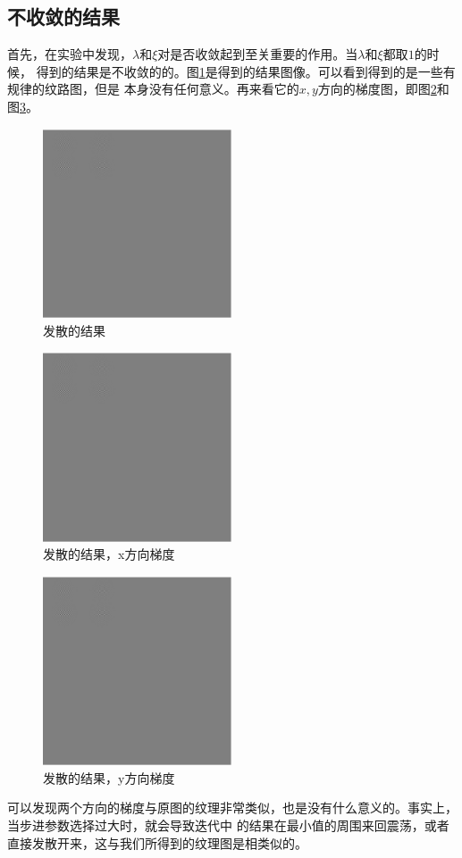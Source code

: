 \subsection{不收敛的结果}
首先，在实验中发现，$\lambda$和$\xi$对是否收敛起到至关重要的作用。当$\lambda$和$\xi$都取$1$的时候，
得到的结果是不收敛的的。图\ref{fig:Iout1}是得到的结果图像。可以看到得到的是一些有规律的纹路图，但是
本身没有任何意义。再来看它的$x,y$方向的梯度图，即图\ref{fig:Ioutx1}和图\ref{fig:Iouty1}。
\begin{figure}[h!]
\center
\includegraphics[width=0.5\textwidth]{figure/gradtest/Iout1}
\caption{发散的结果}\label{fig:Iout1}
\end{figure}
\begin{figure}[h!]
\center
\includegraphics[width=0.5\textwidth]{figure/gradtest/Ioutx1}
\caption{发散的结果，x方向梯度}\label{fig:Ioutx1}
\end{figure}
\begin{figure}[h!]
\center
\includegraphics[width=0.5\textwidth]{figure/gradtest/Iouty1}
\caption{发散的结果，y方向梯度}\label{fig:Iouty1}
\end{figure}
可以发现两个方向的梯度与原图的纹理非常类似，也是没有什么意义的。事实上，当步进参数选择过大时，就会导致迭代中
的结果在最小值的周围来回震荡，或者直接发散开来，这与我们所得到的纹理图是相类似的。
\FloatBarrier


